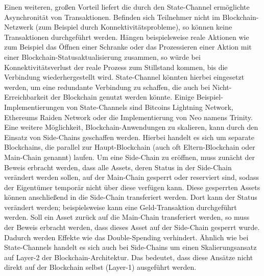 Einen weiteren, großen Vorteil liefert die durch den State-Channel ermöglichte Asynchronität von Transaktionen. Befinden sich Teilnehmer nicht im Blockchain-Netzwerk (zum Beispiel durch Konnektivitätsprobleme), so können keine Transaktionen durchgeführt werden. Hängen beispielsweise reale Aktionen wie zum Beispiel das Öffnen einer Schranke oder das Prozessieren einer Aktion mit einer Blockchain-Statusaktualisierung zusammen, so würde bei Konnektivitätsverlust der reale Prozess zum Stillstand kommen, bis die Verbindung wiederhergestellt wird. State-Channel könnten hierbei eingesetzt werden, um eine redundante Verbindung zu schaffen, die auch bei Nicht-Erreichbarkeit der Blockchain genutzt werden könnte. Einige Beispiel-Implementierungen von State-Channels sind Bitcoins Lightning Network, Ethereums Raiden Network oder die Implementierung von Neo namens Trinity.\\
Eine weitere Möglichkeit, Blockchain-Anwendungen zu skalieren, kann durch den Einsatz von Side-Chains geschaffen werden. Hierbei handelt es sich um separate Blockchains, die parallel zur Haupt-Blockchain (auch oft Eltern-Blockchain oder Main-Chain genannt) laufen. Um eine Side-Chain zu eröffnen, muss zunächt der Beweis erbracht werden, dass alle Assets, deren Status in der Side-Chain verändert werden sollen, auf der Main-Chain gesperrt oder reserviert sind, sodass der Eigentümer temporär nicht über diese verfügen kann. Diese gesperrten Assets können anschließend in die Side-Chain transferiert werden. Dort kann der Status verändert werden; beispielsweise kann eine Geld-Transaktion durchgeführt werden. Soll ein Asset zurück auf die Main-Chain transferiert werden, so muss der Beweis erbracht werden, dass dieses Asset auf der Side-Chain gesperrt wurde. Dadurch werden Effekte wie das Double-Spending verhindert. Ähnlich wie bei State-Channels handelt es sich auch bei Side-Chains um einen Skalierungsansatz auf Layer-2 der Blockchain-Architektur. Das bedeutet, dass diese Ansätze nicht direkt auf der Blockchain selbst (Layer-1) ausgeführt werden.

